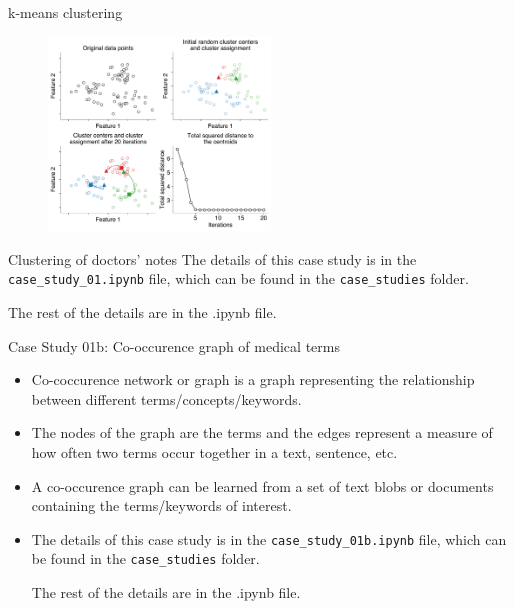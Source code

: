 \documentclass[aspectratio=169]{beamer}
\let\olditem\item
\renewcommand{\item}{\setlength{\itemsep}{\fill}\olditem}
\begin{document}
\begin{frame}[t]{k-means clustering}
  \begin{figure}
    \centering
    \includegraphics[width=0.525\textwidth]{kmeans-algo.pdf}
  \end{figure}
\end{frame}


\begin{frame}[t]{Clustering of doctors' notes}
  The details of this case study is in the \texttt{case\_study\_01.ipynb} file, which can be found in the \texttt{case\_studies} folder.

  The rest of the details are in the .ipynb file.
\end{frame}


\begin{frame}[t]{Case Study 01b: Co-occurence graph of medical terms}
  \begin{itemize}
    \item Co-coccurence network or graph is a graph representing the relationship between different terms/concepts/keywords.
    \item The nodes of the graph are the terms and the edges represent a measure of how often two terms occur together in a text, sentence, etc.
    \item A co-occurence graph can be learned from a set of text blobs or documents containing the terms/keywords of interest.
    \item The details of this case study is in the \texttt{case\_study\_01b.ipynb} file, which can be found in the \texttt{case\_studies} folder.

    
    The rest of the details are in the .ipynb file.
  \end{itemize}
\end{frame}
\end{document}
